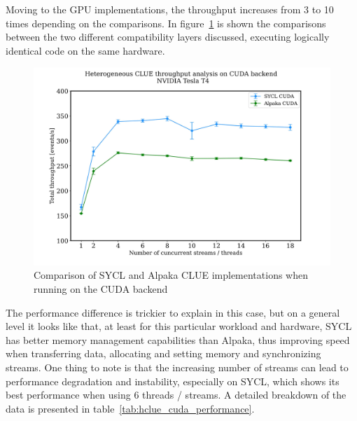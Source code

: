 Moving to the GPU implementations, the throughput increases from 3 to 10 times depending on the comparisons. In figure~\ref{fig:hclue_cuda_performance} is shown the comparisons between the two different compatibility layers discussed, executing logically identical code on the same hardware.

\begin{figure}[H]
    \centering
    \includegraphics[width=\textwidth]{media/hclue_cuda_performance.jpg}
    \caption{Comparison of SYCL and Alpaka CLUE implementations when running on the CUDA backend}
    \label{fig:hclue_cuda_performance}
\end{figure}
\noindent
The performance difference is trickier to explain in this case, but on a general level it looks like that, at least for this particular workload and hardware, SYCL has better memory management capabilities than Alpaka, thus improving speed when transferring data, allocating and setting memory and synchronizing streams. One thing to note is that the increasing number of streams can lead to performance degradation and instability, especially on SYCL, which shows its best performance when using 6 threads / streams. A detailed breakdown of the data is presented in table~\ref{tab:hclue_cuda_performance}.

